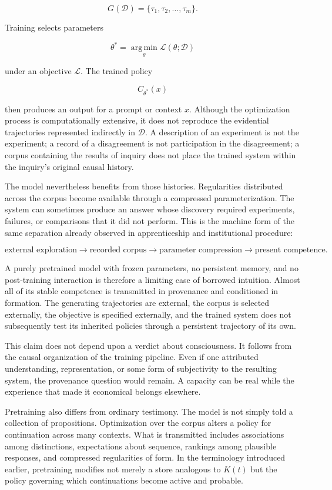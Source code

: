 \documentclass[11pt]{article}
\begin{document}
\[
G(\mathcal{D})
=
\{\tau_1,\tau_2,\ldots,\tau_m\}.
\]

Training selects parameters

\[
\theta^{*}
=
\operatorname*{arg\,min}_{\theta}
\mathcal{L}(\theta;\mathcal{D})
\]

under an objective $\mathcal{L}$. The trained policy

\[
C_{\theta^{*}}(x)
\]

then produces an output for a prompt or context $x$. Although the optimization process is computationally extensive, it does not reproduce the evidential trajectories represented indirectly in $\mathcal{D}$. A description of an experiment is not the experiment; a record of a disagreement is not participation in the disagreement; a corpus containing the results of inquiry does not place the trained system within the inquiry's original causal history.

The model nevertheless benefits from those histories. Regularities distributed across the corpus become available through a compressed parameterization. The system can sometimes produce an answer whose discovery required experiments, failures, or comparisons that it did not perform. This is the machine form of the same separation already observed in apprenticeship and institutional procedure:

\[
\text{external exploration}
\longrightarrow
\text{recorded corpus}
\longrightarrow
\text{parameter compression}
\longrightarrow
\text{present competence}.
\]

A purely pretrained model with frozen parameters, no persistent memory, and no post-training interaction is therefore a limiting case of borrowed intuition. Almost all of its stable competence is transmitted in provenance and conditioned in formation. The generating trajectories are external, the corpus is selected externally, the objective is specified externally, and the trained system does not subsequently test its inherited policies through a persistent trajectory of its own.

This claim does not depend upon a verdict about consciousness. It follows from the causal organization of the training pipeline. Even if one attributed understanding, representation, or some form of subjectivity to the resulting system, the provenance question would remain. A capacity can be real while the experience that made it economical belongs elsewhere.

Pretraining also differs from ordinary testimony. The model is not simply told a collection of propositions. Optimization over the corpus alters a policy for continuation across many contexts. What is transmitted includes associations among distinctions, expectations about sequence, rankings among plausible responses, and compressed regularities of form. In the terminology introduced earlier, pretraining modifies not merely a store analogous to $K(t)$ but the policy governing which continuations become active and probable.
\end{document}
